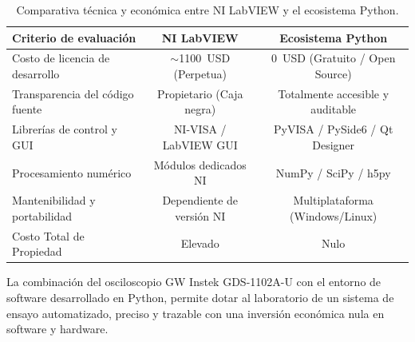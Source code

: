 \begin{table}[H]
    \centering
    \begin{small}
        \caption{Comparativa técnica y económica entre NI LabVIEW y el ecosistema Python.}
        \label{tab:comparativa_software_costos}
        \begin{tabular}{lcc}
            \toprule
            \textbf{Criterio de evaluación} & \textbf{NI LabVIEW} & \textbf{Ecosistema Python} \\ \midrule
            Costo de licencia de desarrollo & $\sim$\qty{1100}{USD} (Perpetua) & \qty{0}{USD} (Gratuito / Open Source) \\ \midrule
            Transparencia del código fuente & Propietario (Caja negra) & Totalmente accesible y auditable \\ \midrule
            Librerías de control y GUI & NI-VISA / LabVIEW GUI & PyVISA / PySide6 / Qt Designer \\ \midrule
            Procesamiento numérico & Módulos dedicados NI & NumPy / SciPy / h5py \\ \midrule
            Mantenibilidad y portabilidad & Dependiente de versión NI & Multiplataforma (Windows/Linux) \\ \midrule
            Costo Total de Propiedad & Elevado & Nulo \\ \bottomrule
        \end{tabular}
    \end{small}
\end{table}

La combinación del osciloscopio GW Instek GDS-1102A-U con el entorno de software desarrollado en Python, permite dotar al laboratorio de un sistema de ensayo automatizado, preciso y trazable con una inversión económica nula en software y hardware.